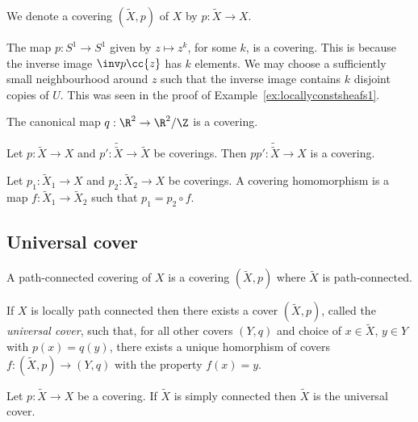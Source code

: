 \documentclass{article}
\begin{document}
\begin{notation}
  We denote a covering $(\tilde X,p)$ of $X$ by $p:\tilde X\to X$.
\end{notation}

\begin{example}
  The map $p:S^1\to S^1$ given by $z\mapsto z^k$, for some $k$, is a covering.
  This is because the inverse image $\inv p\cc{z}$ has $k$
  elements. We may choose a sufficiently small neighbourhood around $z$
  such that the inverse image contains $k$ disjoint copies of $U$. This was seen
  in the proof of Example~\ref{ex:locallyconstsheafs1}.
\end{example}

\begin{example}
  The canonical map $q:\R^2\to\R^2/\Z$ is a covering.
\end{example}

\begin{proposition}
  Let $p:\tilde X\to X$ and $p':\tilde{\tilde X}\to\tilde X$ be coverings.
  Then $pp':\tilde{\tilde{X}}\to X$ is a covering.
\end{proposition}

\begin{definition}
  Let $p_1:\tilde X_1\to X$ and $p_2:\tilde X_2\to X$ be coverings. A covering homomorphism
  is a map $f:\tilde X_1\to\tilde X_2$ such that $p_1 = p_2\circ f$.
\end{definition}

\subsection{Universal cover}

\begin{definition}
  A path-connected covering of $X$ is a covering $(\tilde X,p)$ where $\tilde X$ is
  path-connected.
\end{definition}

\begin{theorem}
  If $X$ is locally path connected then there exists a cover $(\tilde X,p)$, called the \emph{universal cover},
  such that, for all other covers $(Y,q)$ and choice of $x\in \tilde X$, $y\in Y$
  with $p(x) = q(y)$, there exists a unique homorphism of covers $f:(\tilde X,p)\to(Y,q)$
  with the property $f(x) = y$.
\end{theorem}

\begin{theorem}
  Let $p:\tilde X\to X$ be a covering. If $\tilde X$ is simply connected then
  $\tilde X$ is the universal cover.
\end{theorem}
\end{document}
